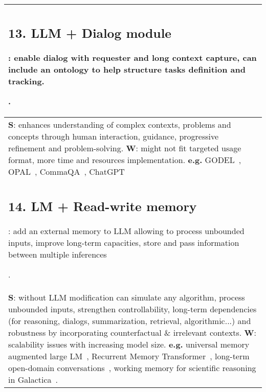 \documentclass[acmsmall]{acmart}
\begin{document}
{\begin{longtable}{p{1\linewidth}}
{\subsection{13. LLM + Dialog module}\label{HP13}:
enable dialog with requester and long context capture, can include an ontology to help structure tasks definition and tracking. }. \\\midrule
{\textbf{S}: enhances understanding of complex contexts, problems and concepts through human interaction, guidance, progressive refinement and problem-solving.
\newline \textbf{W}:} might not fit targeted usage format, more time and resources implementation. \newline \textbf{e.g.} GODEL~\citep{pengGODELLargeScalePreTraining2022}, OPAL~\citep{chenOPALOntologyAwarePretrained2022}, CommaQA~\citep{khotLearningSolveComplex2021}, ChatGPT \\\midrule

{\subsection{14. LM + Read-write memory}\label{HP14}:
add an external memory to LLM allowing to process unbounded inputs, improve long-term capacities, store and pass information between multiple inferences}. \\\midrule
{\textbf{S}: without LLM modification can simulate any algorithm, process unbounded inputs, strengthen controllability, long-term dependencies (for reasoning, dialogs, summarization, retrieval, algorithmic...) and robustness by incorporating counterfactual \& irrelevant contexts.
\newline \textbf{W}:} scalability issues with increasing model size. \newline \textbf{e.g.} universal memory augmented large LM~\citep{schuurmansMemoryAugmentedLarge2023}, Recurrent Memory Transformer~\citep{bulatovRecurrentMemoryTransformer2022}, long-term open-domain conversations~\citep{xuGoldfishMemoryLongTerm2021}, working memory for scientific reasoning in Galactica~\citep{taylorGalacticaLargeLanguage2022}. \\\midrule


\end{longtable}}
\end{document}
